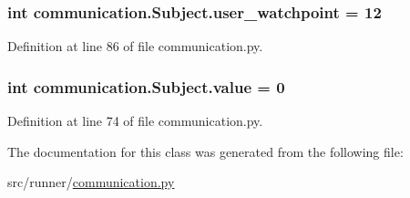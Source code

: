 \subsubsection[{user\+\_\+watchpoint}]{\setlength{\rightskip}{0pt plus 5cm}int communication.\+Subject.\+user\+\_\+watchpoint = 12\hspace{0.3cm}{\ttfamily [static]}}\label{classcommunication_1_1Subject_a73c6626ee68ebdc7f9eacd1065d499e6}


Definition at line 86 of file communication.\+py.

\hypertarget{classcommunication_1_1Subject_a03b6acd0ec2293b7d3ca0730f33825fc}{}
\subsubsection[{value}]{\setlength{\rightskip}{0pt plus 5cm}int communication.\+Subject.\+value = 0\hspace{0.3cm}{\ttfamily [static]}}\label{classcommunication_1_1Subject_a03b6acd0ec2293b7d3ca0730f33825fc}


Definition at line 74 of file communication.\+py.



The documentation for this class was generated from the following file\+:\begin{DoxyCompactItemize}
\item 
src/runner/\hyperlink{communication_8py}{communication.\+py}\end{DoxyCompactItemize}
